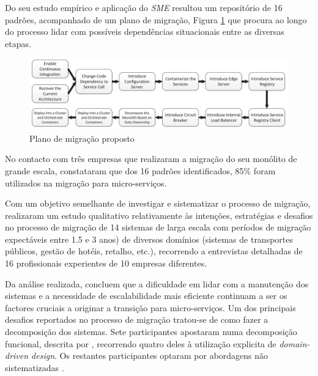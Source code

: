     Do seu estudo empírico e aplicação do \textit{SME} resultou um repositório de 16 padrões, acompanhado de um plano de migração, Figura \ref{fig:plano_migracao_migroservicos} que procura ao longo do processo lidar com possíveis dependências situacionais entre as diversas etapas.
    
	\begin{figure}[h]
     	\begin{center}
     		\includegraphics[width=\textwidth]{img/migration_plan.png}
     	\end{center}
     	\caption{Plano de migração proposto}
     	\label{fig:plano_migracao_migroservicos}
 	\end{figure}
    
    No contacto com três empresas que realizaram a migração do seu monólito de grande escala, constataram que dos 16 padrões identificados, 85\% foram utilizados na migração para micro-serviços.
    
    
    Com um objetivo semelhante de investigar e sistematizar o processo de migração, \cite{fritzsch19_migration_in_industry} realizaram um estudo qualitativo relativamente às intenções, estratégias e desafios no processo de migração de 14 sistemas de larga escala com períodos de migração expectáveis entre 1.5 e 3 anos) de diversos domínios (sistemas de transportes públicos, gestão de hotéis, retalho, etc.), recorrendo a entrevistas detalhadas de 16 profissionais experientes de 10 empresas diferentes. 
    
    Da análise realizada, concluem que a dificuldade em lidar com a manutenção dos sistemas e a necessidade de escalabilidade mais eficiente continuam a ser os factores cruciais a originar a transição para micro-serviços. Um dos principais desafios reportados no processo de migração tratou-se de como fazer a decomposição dos sistemas. Sete participantes apostaram numa decomposição funcional, descrita por \cite{fowler14_definition_microservices}, recorrendo quatro deles à utilização explicita de \textit{domain-driven design}. Os restantes participantes optaram por abordagens não sistematizadas \citep{fritzsch19_migration_in_industry}.
    
